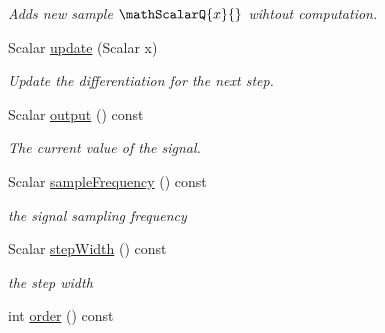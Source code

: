 \begin{DoxyCompactItemize}
\begin{DoxyCompactList}\small\item\em Adds new sample $\mathScalarQ{x}{}$ wihtout computation. \end{DoxyCompactList}\item 
Scalar \hyperlink{classow__core_1_1ScalarFiniteDifference_a9294a35bb0080ea935b24f6659a0ad6f}{update} (Scalar x)
\begin{DoxyCompactList}\small\item\em Update the differentiation for the next step. \end{DoxyCompactList}\item 
Scalar \hyperlink{classow__core_1_1ScalarFiniteDifference_a105a650b3c8edff4d598dc18d0754022}{output} () const \hypertarget{classow__core_1_1ScalarFiniteDifference_a105a650b3c8edff4d598dc18d0754022}{}\label{classow__core_1_1ScalarFiniteDifference_a105a650b3c8edff4d598dc18d0754022}

\begin{DoxyCompactList}\small\item\em The current value of the signal. \end{DoxyCompactList}\item 
Scalar \hyperlink{classow__core_1_1ScalarFiniteDifference_a8046daf62a29d5e9a748fbd94cb0b79e}{sample\+Frequency} () const \hypertarget{classow__core_1_1ScalarFiniteDifference_a8046daf62a29d5e9a748fbd94cb0b79e}{}\label{classow__core_1_1ScalarFiniteDifference_a8046daf62a29d5e9a748fbd94cb0b79e}

\begin{DoxyCompactList}\small\item\em the signal sampling frequency \end{DoxyCompactList}\item 
Scalar \hyperlink{classow__core_1_1ScalarFiniteDifference_a0bdddc62ac68a69ee7959a2f1b33d1b7}{step\+Width} () const \hypertarget{classow__core_1_1ScalarFiniteDifference_a0bdddc62ac68a69ee7959a2f1b33d1b7}{}\label{classow__core_1_1ScalarFiniteDifference_a0bdddc62ac68a69ee7959a2f1b33d1b7}

\begin{DoxyCompactList}\small\item\em the step width \end{DoxyCompactList}\item 
int \hyperlink{classow__core_1_1ScalarFiniteDifference_abd716b78f9efb2a0e681ab81b75af343}{order} () const \hypertarget{classow__core_1_1ScalarFiniteDifference_abd716b78f9efb2a0e681ab81b75af343}{}\label{classow__core_1_1ScalarFiniteDifference_abd716b78f9efb2a0e681ab81b75af343}


\end{DoxyCompactItemize}
